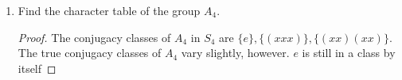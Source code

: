 \documentclass[../psets.tex]{subfiles}
\begin{document}
\begin{enumerate}
\begin{enumerate}
\begin{proof}
\begin{align*}
                &= (\chi^2,1)-2(\chi,1)+(1,1)\\
                &= 2-2\cdot 1+1\\
                &= 1
            \end{align*}
            so $\theta$ is irreducible by Corollary 2 from Lecture 3.3.\par\smallskip
            Suppose that $\theta$ is irreducible. Then $(\theta,\theta)=1$. We still have $(\chi,\chi)=(\chi^2,1)$, $(\chi,1)=(1,\chi)=1$, and $(1,1)=1$ because these claims relied on the definition of the inner product and part (a), not the hypothesis that $(\chi^2,1)=2$. Thus, we have that
            \begin{equation*}
                (\chi^2,1) = (\theta,\theta)+2(\chi,1)-(1,1)
                = 1+2-1
                = 2
            \end{equation*}
            as desired.
        \end{proof}
    \end{enumerate}
    \item Find the character table of the group $A_4$.
    \begin{proof}
        The conjugacy classes of $A_4$ in $S_4$ are $\{e\},\{(xxx)\},\{(xx)(xx)\}$. The true conjugacy classes of $A_4$ vary slightly, however. $e$ is still in a class by itself


\end{proof}
\end{enumerate}
\end{document}
